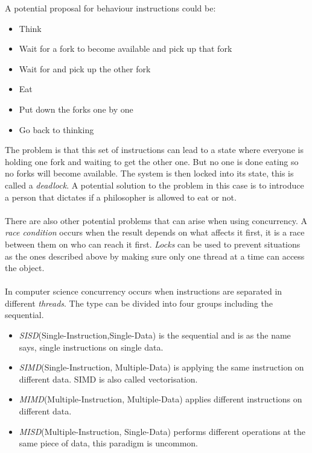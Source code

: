 \documentclass[10pt,a4paper]{report}
\begin{document}
A potential proposal for behaviour instructions could be:
\begin{itemize}
 \item Think
 \item Wait for a fork to become available and pick up that fork
 \item Wait for and pick up the other fork
 \item Eat
 \item Put down the forks one by one
 \item Go back to thinking
\end{itemize}
The problem is that this set of instructions can lead to a state where everyone is holding one fork and waiting to get the other one\cite{hoare1985communicating}. But no one is done eating so no forks will become available. The system is then locked into its state, this is called a \emph{deadlock}\cite{hoare1985communicating, introduction_hpc_hager}. A potential solution to the problem in this case is to introduce a person that dictates if a philosopher is allowed to eat or not\cite{hoare1985communicating}.\\
\\
There are also other potential problems that can arise when using concurrency. A \emph{race condition} occurs when the result depends on what affects it first, it is a race between them on who can reach it first\cite{introduction_hpc_hager}. \emph{Locks} can be used to prevent situations as the ones described above by making sure only one thread at a time can access the object\cite{introduction_hpc_hager}.\\
\\
In computer science concurrency occurs when instructions are separated in different \emph{threads}. The type can be divided into four groups including the sequential.
\begin{itemize}
 \item \emph{SISD}(Single-Instruction,Single-Data) is the sequential and is as the name says, single instructions on single data\cite{introduction_hpc_hager}.
 \item \emph{SIMD}(Single-Instruction, Multiple-Data) is applying the same instruction on different data\cite{introduction_hpc_hager}. SIMD is also called vectorisation\cite{introduction_hpc_hager}.
 \item \emph{MIMD}(Multiple-Instruction, Multiple-Data) applies different instructions on different data\cite{introduction_hpc_hager}.
 \item \emph{MISD}(Multiple-Instruction, Single-Data) performs different operations at the same piece of data, this paradigm is uncommon\cite{introduction_hpc_hager}.
\end{itemize}
\end{document}
